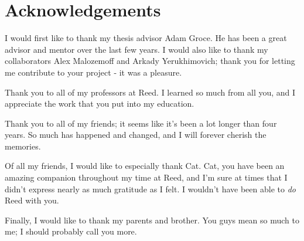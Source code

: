 

\chapter*{Acknowledgements}
I would first like to thank my thesis advisor Adam Groce. 
He has been a great advisor and mentor over the last few years.
I would also like to thank my collaborators Alex Malozemoff and Arkady Yerukhimovich; thank you for letting me contribute to your project - it was a pleasure.

Thank you to all of my professors at Reed. 
I learned so much from all you, and I appreciate the work that you put into my education.

Thank you to all of my friends; it seems like it's been a lot longer than four years.
So much has happened and changed, and I will forever cherish the memories.

Of all my friends, I would like to especially thank Cat. 
Cat, you have been an amazing companion throughout my time at Reed, and I'm sure at times that I didn't express nearly as much gratitude as I felt. 
I wouldn't have been able to \textit{do} Reed with you. 

Finally, I would like to thank my parents and brother.
You guys mean so much to me; I should probably call you more. 


